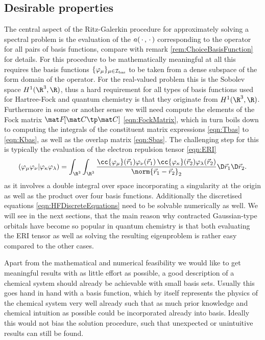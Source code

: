 \subsection{Desirable properties}
\label{sec:BasisDesiredProperties}
The central aspect of the Ritz-Galerkin procedure for
approximately solving a spectral problem
is the evaluation of the $a(\,\cdot\,,\,\cdot\,)$
corresponding to the operator for all pairs of basis functions,
compare with remark \vref{rem:ChoiceBasisFunction} for details.
For this procedure to be mathematically meaningful at all
this requires the basis functions $\{\varphi_\mu\}_{\mu\in\mathcal{I}_\text{bas}}$
to be taken from a dense subspace of the form domain of the operator.
For the real-valued \HF problem this is the Sobolev space $H^1(\R^3, \R)$,
thus a hard requirement for all types of basis functions
used for Hartree-Fock and quantum chemistry is that
they originate from $H^1(\R^3, \R)$.
Furthermore in some or another sense we will need compute the elements
of the Fock matrix $\matFfull$ \eqref{eqn:FockMatrix},
which in turn boils down to computing the integrals of the constituent
matrix expressions \eqref{eqn:Tbas} to \eqref{eqn:Kbas},
as well as the overlap matrix \eqref{eqn:Sbas}.
The challenging step for this is typically the evaluation
of the electron repulsion tensor \eqref{eqn:ERI}
\[
	\eriMu{\varphi_\mu \varphi_\nu}{\varphi_\kappa \varphi_\lambda}
		= \int_{\R^3} \int_{\R^3}
			\frac{\cc{\varphi_\mu}(\vec{r}_1) \varphi_\nu(\vec{r}_1)
				\,\cc{\varphi_\kappa}(\vec{r}_2) \varphi_\lambda(\vec{r}_2)}
			{\norm{\vec{r}_1 - \vec{r}_2}_2}
			\D \vec{r}_1 \D \vec{r}_2.
\]
as it involves a double integral over space
incorporating a singularity at the origin
as well as the product over four basis functions.
Additionally the discretised \HF equations \eqref{eqn:HFDiscreteEquations}
need to be solvable numerically as well.
We will see in the next sections,
that the main reason why contracted Gaussian-type orbitals
have become so popular in quantum chemistry
is that both evaluating the ERI tensor
as well as solving the resulting eigenproblem
is rather easy compared to the other cases.

Apart from the mathematical and numerical feasibility
we would like to get meaningful results with as little effort as possible,
\ie a good description of a chemical system should already be achievable
with small basis sets.
Usually this goes hand in hand with a basis function,
which by itself represents the physics
of the chemical system very well already
such that as much prior knowledge and chemical intuition as possible
could be incorporated already into basis.
Ideally this would not bias the solution procedure,
such that unexpected or unintuitive results can still be found.

